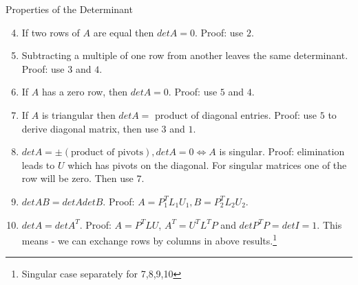 \documentclass{beamer}
\begin{document}
\begin{frame}{Properties of the Determinant}
\begin{enumerate}
    \setcounter{enumi}{3}
    \item If two rows of $A$ are equal then $detA = 0$. Proof: use $2$.
    \item Subtracting a multiple of one row from another leaves the same determinant. Proof: use $3$ and $4$.
    \item If $A$ has a zero row, then $detA = 0$. Proof: use $5$ and $4$.
    \item If $A$ is triangular then $detA = $ product of diagonal entries. Proof: use $5$ to derive diagonal matrix, then use $3$ and $1$.
    \item $detA = \pm(\text{product of pivots}), detA = 0 \iff A$ is singular. Proof: elimination leads to $U$ which has pivots on the diagonal. For singular matrices one of the row will be zero. Then use $7$.
    \item $detAB = detAdetB$. Proof: $A=P_1^TL_1U_1, B = P_2^TL_2U_2$.
    \item $detA = detA^T$. Proof: $A = P^TLU$, $A^T=U^TL^TP$ and $detP^TP = detI = 1$. This means - we can exchange rows by columns in above results.\footnote{Singular case separately for 7,8,9,10}
\end{enumerate}
\end{frame}
\end{document}
